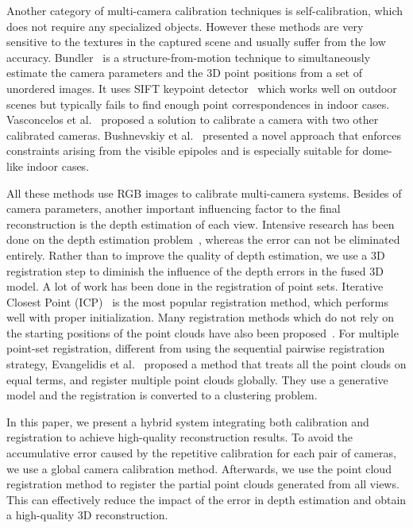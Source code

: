 Another category of multi-camera calibration techniques is self-calibration, which does not require any specialized objects.
However these methods are very sensitive to the textures in the captured scene and usually suffer from the low accuracy.
%
Bundler~\cite{snavely2006photo} is a structure-from-motion technique to simultaneously estimate the camera parameters and the 3D point positions from a set of unordered images.
%
It uses SIFT keypoint detector~\cite{lowe2004distinctive} which works well on outdoor scenes but typically fails to find enough point correspondences in indoor cases.
%
Vasconcelos et al.~\cite{vasconcelos2012minimal} proposed a solution to calibrate a camera with two other calibrated cameras.
Bushnevskiy et al.~\cite{bushnevskiy2016multicamera} presented a novel approach that enforces constraints arising from the visible epipoles and is especially suitable for dome-like indoor cases.

All these methods use RGB images to calibrate multi-camera systems.
%
Besides of camera parameters, another important influencing factor to the final reconstruction is the depth estimation of each view.
Intensive research has been done on the depth estimation problem~\cite{scharstein,Bleyer2011PatchMatch}, whereas the error can not be eliminated entirely.
%
Rather than to improve the quality of depth estimation, we use a 3D registration step to diminish the influence of the depth errors in the fused 3D model.
%
A lot of work has been done in the registration of point sets.
Iterative Closest Point (ICP)~\cite{Besl1992A} is the most popular registration method, which performs well with proper initialization.
%
Many registration methods which do not rely on the starting positions of the point clouds have also been proposed~\cite{Aiger:2008:CSR:1360612.1360684,5152473}.
%
For multiple point-set registration, different from using the sequential pairwise registration strategy, Evangelidis et al.~\cite{Evangelidis-ECCV-2014} proposed a method that treats all the point clouds on equal terms, and register multiple point clouds globally.
%
They use a generative model and the registration is converted to a clustering problem.

In this paper, we present a hybrid system integrating both calibration and registration to achieve high-quality reconstruction results. To avoid the accumulative error caused by the repetitive calibration for each pair of cameras, we use a global camera calibration method. 
Afterwards, we use the point cloud registration method to register the partial point clouds generated from all views. 
This can effectively reduce the impact of the error in depth estimation and obtain a high-quality 3D reconstruction.






